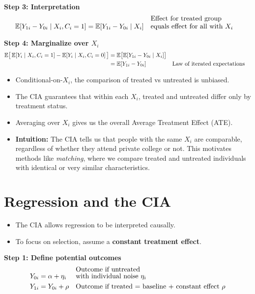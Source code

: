 \documentclass[12pt]{article}
\begin{document}
\vspace{1em}
\noindent \textbf{Step 3: Interpretation}  
\begin{align}
\mathbb{E}[Y_{1i} - Y_{0i} \mid X_i, C_i=1] 
   &= \mathbb{E}[Y_{1i} - Y_{0i} \mid X_i] && \text{\shortstack[l]{Effect for treated group \\ equals effect for all with $X_i$}}
\end{align}

\vspace{1em}
\noindent \textbf{Step 4: Marginalize over $X_i$}  
\begin{align}
\mathbb{E}\big[ \, \mathbb{E}[Y_i \mid X_i, C_i=1] - \mathbb{E}[Y_i \mid X_i, C_i=0] \, \big] 
   &= \mathbb{E}\big[ \mathbb{E}[Y_{1i} - Y_{0i} \mid X_i] \big] \\
   &= \mathbb{E}[Y_{1i} - Y_{0i}] && \text{\shortstack[l]{Law of iterated expectations}}
\end{align}

\begin{itemize}
    \item Conditional-on-$X_i$, the comparison of treated vs untreated is unbiased.  
    \item The CIA guarantees that within each $X_i$, treated and untreated differ only by treatment status.  
    \item Averaging over $X_i$ gives us the overall Average Treatment Effect (ATE).  
    \item \textbf{Intuition:} The CIA tells us that people with the same $X_i$ are comparable, regardless of whether they attend private college or not. This motivates methods like \textit{matching}, where we compare treated and untreated individuals with identical or very similar characteristics.
\end{itemize}

\section*{\noindent\textbf{Regression and the CIA}}

\begin{itemize}
    \item The CIA allows regression to be interpreted causally.  
    \item To focus on selection, assume a \textbf{constant treatment effect}.  
\end{itemize}

\singlespacing
\noindent \textbf{Step 1: Define potential outcomes}  
\begin{align}
Y_{0i} &= \alpha + \eta_i && \text{\shortstack[l]{Outcome if untreated \\ with individual noise $\eta_i$}} \\
Y_{1i} &= Y_{0i} + \rho && \text{\shortstack[l]{Outcome if treated = baseline + constant effect $\rho$}}
\end{align}
\end{document}
